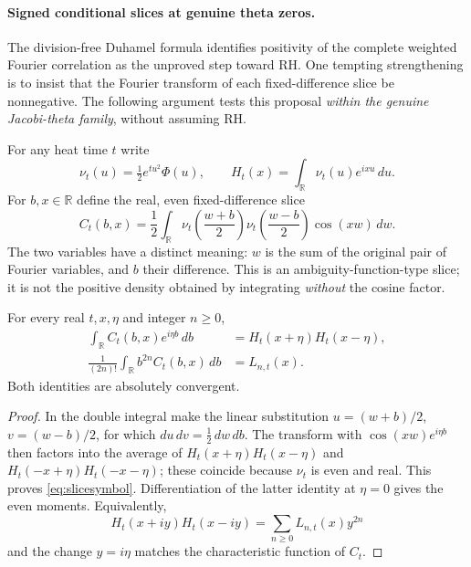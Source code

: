 \paragraph{Signed conditional slices at genuine theta zeros.}
\label{sec:thetasignedslices}

The division-free Duhamel formula identifies positivity
of the complete weighted Fourier correlation as the
unproved step toward RH. One tempting strengthening
is to insist that the Fourier transform of each
fixed-difference slice be nonnegative. The following
argument tests this proposal \emph{within the genuine
Jacobi-theta family}, without assuming RH.

For any heat time $t$ write
\[
\nu_t(u)=\tfrac12e^{tu^2}\Phi(u),\qquad
H_t(x)=\int_{\mathbb R}\nu_t(u)e^{ixu}\,du .
\]
For $b,x\in\mathbb R$ define the real, even
fixed-difference slice
\begin{equation}
C_t(b,x)=\frac12\int_{\mathbb R}
\nu_t\!\left(\frac{w+b}{2}\right)
\nu_t\!\left(\frac{w-b}{2}\right)
\cos(xw)\,dw .
\label{eq:thetafixedslice}
\end{equation}
The two variables have a distinct meaning:
$w$ is the sum of the original pair of
Fourier variables, and $b$ their difference.
This is an ambiguity-function-type slice;
it is not the positive density obtained by
integrating \emph{without} the cosine factor.

\begin{proposition}
\label{prop:thetafixedsliceidentities}
For every real $t,x,\eta$ and integer $n\ge0$,
\begin{align}
\int_{\mathbb R}C_t(b,x)e^{i\eta b}\,db
&=H_t(x+\eta)H_t(x-\eta),\label{eq:slicesymbol}\\
\frac{1}{(2n)!}
\int_{\mathbb R}b^{2n}C_t(b,x)\,db
&=L_{n,t}(x).\label{eq:slicemoments}
\end{align}
Both identities are absolutely convergent.
\end{proposition}

\begin{proof}
In the double integral make the linear substitution
$u=(w+b)/2$, $v=(w-b)/2$, for which
$du\,dv=\tfrac12\,dw\,db$. The transform
with $\cos(xw)e^{i\eta b}$ then factors into
the average of
$H_t(x+\eta)H_t(x-\eta)$ and
$H_t(-x+\eta)H_t(-x-\eta)$; these coincide
because $\nu_t$ is even and real.
This proves \eqref{eq:slicesymbol}.
Differentiation of the latter identity at
$\eta=0$ gives the even moments.
Equivalently,
\[
H_t(x+iy)H_t(x-iy)
=\sum_{n\ge0}L_{n,t}(x)y^{2n}
\]
and the change $y=i\eta$ matches
the characteristic function of $C_t$.
\end{proof}

